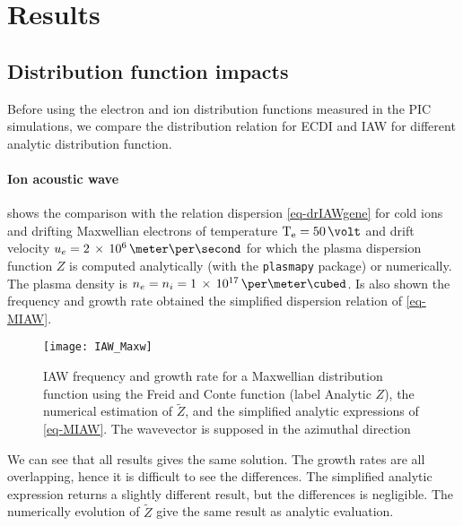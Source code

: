 
\section{Results}
  \label{sec-DR-results}
  
  
  \subsection{Distribution function impacts} \label{subsec-DRimpact}
    Before using the electron and ion distribution functions measured in the \ac{PIC} simulations, we compare the distribution relation for \ac{ECDI} and \ac{IAW} for different analytic distribution function.
    
    \paragraph{Ion acoustic wave\\}
    
     shows the comparison with the relation dispersion \cref{eq-drIAWgene} for cold ions and drifting Maxwellian electrons of temperature $\Te=50\,\volt$ and drift velocity $u_e = \sn{2}{6} \,\meter\per\second$ for which the plasma dispersion function $Z$ is computed analytically (with the \texttt{plasmapy} package) or numerically.
    The plasma density is $n_e = n_i = \sn{1}{17} \,\per\meter\cubed$.
    Is also shown the frequency and growth rate obtained the simplified dispersion relation of \cref{eq-MIAW}. 
    
    \begin{figure}[hbtp]
      \centering
      \texttt{[image: IAW\_Maxw]}
      \caption{\ac{IAW} frequency and growth rate for a Maxwellian distribution function using the Freid and Conte function (label Analytic $Z$), the numerical estimation of $\tilde{Z}$, and the simplified analytic expressions of \cref{eq-MIAW}. The wavevector is supposed in the azimuthal direction }
      \label{fig-IAW_Maxw}
    \end{figure}
    
    We can see that all results gives the same solution.
    The growth rates are all overlapping, hence it is difficult to see the differences.
    The simplified analytic expression returns a slightly different result, but the differences is negligible.
    The numerically evolution of $\tilde{Z}$ give the same result as analytic evaluation.
    
